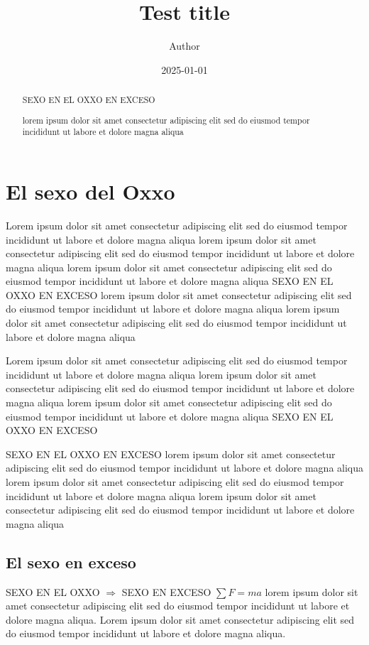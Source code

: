 \documentclass{article}
\title{Test title}
\author{Author}
\date{2025-01-01}
\begin{document}

\maketitle
\newpage

\begin{abstract}
	SEXO EN EL OXXO EN EXCESO

	lorem ipsum dolor sit amet consectetur adipiscing elit sed do eiusmod tempor incididunt ut labore et dolore magna aliqua
\end{abstract}
\newpage

\section{El sexo del Oxxo}
	Lorem ipsum dolor sit amet consectetur adipiscing elit sed do eiusmod tempor incididunt ut labore et dolore magna aliqua
	lorem ipsum dolor sit amet consectetur adipiscing elit sed do eiusmod tempor incididunt ut labore et dolore magna aliqua
	lorem ipsum dolor sit amet consectetur adipiscing elit sed do eiusmod tempor incididunt ut labore et dolore magna aliqua
	SEXO EN EL OXXO EN EXCESO
	lorem ipsum dolor sit amet consectetur adipiscing elit sed do eiusmod tempor incididunt ut labore et dolore magna aliqua
	lorem ipsum dolor sit amet consectetur adipiscing elit sed do eiusmod tempor incididunt ut labore et dolore magna aliqua

	Lorem ipsum dolor sit amet consectetur adipiscing elit sed do eiusmod tempor incididunt ut labore et dolore magna aliqua
	lorem ipsum dolor sit amet consectetur adipiscing elit sed do eiusmod tempor incididunt ut labore et dolore magna aliqua
	lorem ipsum dolor sit amet consectetur adipiscing elit sed do eiusmod tempor incididunt ut labore et dolore magna aliqua
	SEXO EN EL OXXO EN EXCESO
	
	SEXO EN EL OXXO EN EXCESO
	lorem ipsum dolor sit amet consectetur adipiscing elit sed do eiusmod tempor incididunt ut labore et dolore magna aliqua
	lorem ipsum dolor sit amet consectetur adipiscing elit sed do eiusmod tempor incididunt ut labore et dolore magna aliqua
	lorem ipsum dolor sit amet consectetur adipiscing elit sed do eiusmod tempor incididunt ut labore et dolore magna aliqua

	\subsection{El sexo en exceso}	
		SEXO EN EL OXXO $\Rightarrow$ SEXO EN EXCESO $\sum F = ma$
		lorem ipsum dolor sit amet consectetur adipiscing elit sed do eiusmod tempor incididunt ut labore et dolore magna aliqua. 
		Lorem ipsum dolor sit amet consectetur adipiscing elit sed do eiusmod tempor incididunt ut labore et dolore magna aliqua. 
\end{document}
